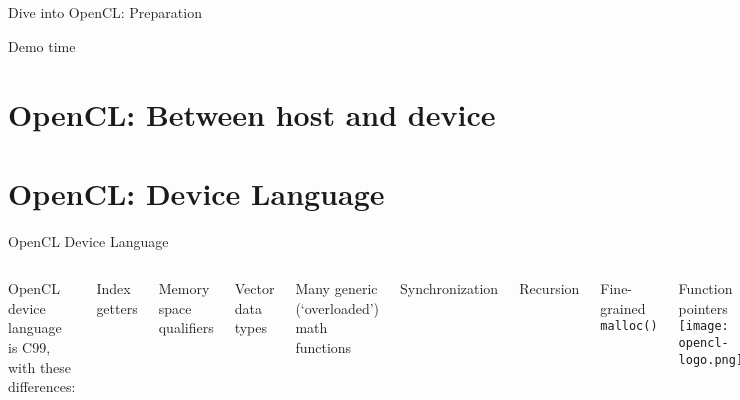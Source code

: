 \documentclass[english,compress]{beamer}
\begin{document}

{
\def\drawgroup#1{
  \foreach \i in {0,1,...,23}
    \foreach \j in {0,1,...,16}
    {
      \pgfmathtruncatemacro{\grp}{(\i+24*\j)/16}
      \ifthenelse{\equal{\grp}{#1}}
        {\def\grpcolor{gray!60}}
        {\def\grpcolor{gray!30}}
      \draw [line width=0.5pt,fill=\grpcolor] (\i,\j) rectangle +(1,1) ;
    }
}



\begin{frame}{Dive into OpenCL: Preparation}
  \begin{center}
  \Huge Demo time
  \end{center}
\end{frame}

\section{OpenCL: Between host and device}

\section{OpenCL: Device Language}
\begin{frame}{OpenCL Device Language}
  \begin{columns}
      OpenCL device language is C99, with these differences:

      \medskip
      \plusball Index getters

      \plusball Memory space qualifiers

      \plusball Vector data types 

      \plusball Many generic (`overloaded') math functions

      \plusball Synchronization

      \minusball Recursion

      \minusball Fine-grained \texttt{malloc()}

      \minusball Function pointers
      \texttt{[image: opencl-logo.png]}
  \end{columns}
\end{frame}

}
\end{document}
